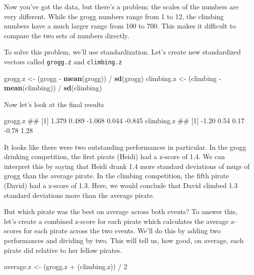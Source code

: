 \documentclass[]{book}
\newenvironment{Shaded}{\begin{snugshade}}{\end{snugshade}}
\newcommand{\KeywordTok}[1]{\textcolor[rgb]{0.13,0.29,0.53}{\textbf{{#1}}}}
\newcommand{\DecValTok}[1]{\textcolor[rgb]{0.00,0.00,0.81}{{#1}}}
\newcommand{\StringTok}[1]{\textcolor[rgb]{0.31,0.60,0.02}{{#1}}}
\newcommand{\NormalTok}[1]{{#1}}
\theoremstyle{definition}
\theoremstyle{definition}
\theoremstyle{remark}
\begin{document}
Now you've got the data, but there's a problem: the scales of the
numbers are very different. While the grogg numbers range from 1 to 12,
the climbing numbers have a much larger range from 100 to 700. This
makes it difficult to compare the two sets of numbers directly.

To solve this problem, we'll use standardization. Let's create new
standardized vectors called \texttt{grogg.z} and \texttt{climbing.z}

\begin{Shaded}
\begin{Highlighting}[]
\NormalTok{grogg.z <-}\StringTok{ }\NormalTok{(grogg -}\StringTok{ }\KeywordTok{mean}\NormalTok{(grogg)) /}\StringTok{ }\KeywordTok{sd}\NormalTok{(grogg)}
\NormalTok{climbing.z <-}\StringTok{ }\NormalTok{(climbing -}\StringTok{ }\KeywordTok{mean}\NormalTok{(climbing)) /}\StringTok{ }\KeywordTok{sd}\NormalTok{(climbing)}
\end{Highlighting}
\end{Shaded}

Now let's look at the final results

\begin{Shaded}
\begin{Highlighting}[]
\NormalTok{grogg.z}
\NormalTok{## [1]  1.379  0.489 -1.068  0.044 -0.845}
\NormalTok{climbing.z}
\NormalTok{## [1] -1.20  0.54  0.17 -0.78  1.28}
\end{Highlighting}
\end{Shaded}

It looks like there were two outstanding performances in particular. In
the grogg drinking competition, the first pirate (Heidi) had a z-score
of 1.4. We can interpret this by saying that Heidi drank 1.4 more
standard deviations of mugs of grogg than the average pirate. In the
climbing competition, the fifth pirate (David) had a z-score of 1.3.
Here, we would conclude that David climbed 1.3 standard deviations more
than the average pirate.

But which pirate was the best on average across both events? To answer
this, let's create a combined z-score for each pirate which calculates
the average z-scores for each pirate across the two events. We'll do
this by adding two performances and dividing by two. This will tell us,
how good, on average, each pirate did relative to her fellow pirates.

\begin{Shaded}
\begin{Highlighting}[]
\NormalTok{average.z <-}\StringTok{ }\NormalTok{(grogg.z +}\StringTok{ }\NormalTok{(climbing.z)) /}\StringTok{ }\DecValTok{2}
\end{Highlighting}
\end{Shaded}
\end{document}
